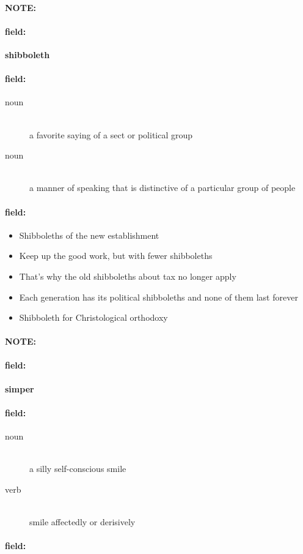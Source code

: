 \documentclass[12pt]{article}
\newenvironment{note}{\paragraph{NOTE:}}{}
\newenvironment{field}{\paragraph{field:}}{}
\begin{document}
\begin{note}
\begin{field}
\textbf{\large shibboleth}
\end{field}


\begin{field}
\begin{description}
\item[noun] \hfill \\ 
a favorite saying of a sect or political group

\item[noun] \hfill \\ 
a manner of speaking that is distinctive of a particular group of people

\end{description}
\end{field}

\begin{field}
\begin{itemize}
\item Shibboleths of the new establishment
\item Keep up the good work, but with fewer shibboleths
\item That's why the old shibboleths about tax no longer apply
\item Each generation has its political shibboleths and none of them last forever
\item Shibboleth for Christological orthodoxy
\end{itemize}
\end{field}
\end{note}
\begin{note}
\begin{field}
\textbf{\large simper}
\end{field}


\begin{field}
\begin{description}
\item[noun] \hfill \\ 
a silly self-conscious smile

\item[verb] \hfill \\ 
smile affectedly or derisively

\end{description}
\end{field}

\begin{field}
\end{field}
\end{note}
\end{document}
